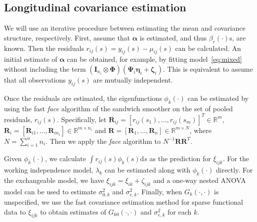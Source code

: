 \documentclass[submit]{smj}
\def\balpha{\boldsymbol{\alpha}}
\def\balpha{\boldsymbol{\alpha}}
\def\bPsi{\boldsymbol{\Psi}}
\def\bPhi{\boldsymbol{\Phi}}
\def\bzeta{\boldsymbol{\zeta}}
\def\beeta{\boldsymbol{\eta}}
\begin{document}
\subsection{Longitudinal  covariance estimation} 

We will use an iterative procedure between estimating the mean and covariance structure, respectively. First, assume  that $\balpha$ is estimated, and thus $\beta_r(\cdot)$s, are known. Then the residuals $r_{ij}(s) = y_{ij}(s) - \mu_{ij}(s)$ can be calculated. 
An initial estimate of $\balpha$ can be obtained, for example, by fitting
model~\eqref{eq:mixed} without including the term $(\mathbf{I}_{n_i}\otimes \bPhi)\left(
\bPsi_i\beeta_i  + \bzeta_i\right)$. This is equivalent to assume that all observations $y_{ij}(s)$ are mutually independent.

Once the residuals are estimated, the eigenfunctions $\phi_k(\cdot)$ can be estimated by using the fast {\it face} algorithm \citep{Xiao2016} of the sandwich smoother \citep{Xiao2013} on the set of pooled residuals, $r_{ij}(s)$. Specifically, let $\boldsymbol{R}_{ij} = [r_{ij}(s_1),\ldots, r_{ij}(s_m)]^{T} \in \mathbb{R}^m$, 
$\boldsymbol{R}_i = [\boldsymbol{R}_{i1},\ldots, \boldsymbol{R}_{in_i}] \in \mathbb{R}^{m\times n_i}$ and $\boldsymbol{R} = [\boldsymbol{R}_1,\ldots, \boldsymbol{R}_n]\in \mathbb{R}^{m\times N}$, where $N = \sum_{i=1}^n n_i$. Then we apply the {\it face} algorithm to $N^{-1} \boldsymbol{R}\boldsymbol{R}^{T}$.

Given $\phi_k(\cdot)$, we  calculate $\int r_{ij}(s)\phi_k(s)\mathrm{d}s$ as the prediction for $\xi_{ijk}$.
For the working independence model,
$\lambda_k$ can be estimated along with $\phi_k(\cdot)$ directly.
For the exchangeable model, we have $\xi_{ijk} = \xi_{ik} + \zeta_{ijk}$ and a one-way nested ANOVA model can be used to estimate $\sigma_{0,k}^2$ and $\sigma_{e,k}^2$. Finally, when $G_k(\cdot,\cdot)$ is unspecified, we use the fast covariance estimation method for sparse functional data \citep{Xiao2018}
to $\xi_{ijk}$ to obtain estimates of $G_{k0}(\cdot,\cdot)$ and $\sigma_{e,k}^2$ for each $k$.
\end{document}
